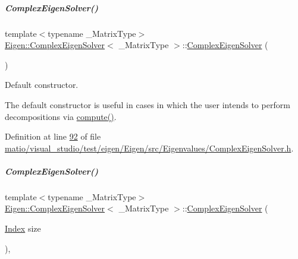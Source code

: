 \mbox{\label{group___eigenvalues___module_a3322a21574c61eefd450c003515ad802}} 
\subparagraph{\texorpdfstring{Complex\+Eigen\+Solver()}{ComplexEigenSolver()}\hspace{0.1cm}{\footnotesize\ttfamily [4/6]}}
{\footnotesize\ttfamily template$<$typename \+\_\+\+Matrix\+Type$>$ \\
\hyperlink{group___eigenvalues___module_class_eigen_1_1_complex_eigen_solver}{Eigen\+::\+Complex\+Eigen\+Solver}$<$ \+\_\+\+Matrix\+Type $>$\+::\hyperlink{group___eigenvalues___module_class_eigen_1_1_complex_eigen_solver}{Complex\+Eigen\+Solver} (\begin{DoxyParamCaption}{ }\end{DoxyParamCaption})\hspace{0.3cm}{\ttfamily [inline]}}



Default constructor. 

The default constructor is useful in cases in which the user intends to perform decompositions via \hyperlink{group___eigenvalues___module_aeb7e38c6db5369f5c974f3786e94c1f0}{compute()}. 

Definition at line \hyperlink{matio_2visual__studio_2test_2eigen_2_eigen_2src_2_eigenvalues_2_complex_eigen_solver_8h_source_l00092}{92} of file \hyperlink{matio_2visual__studio_2test_2eigen_2_eigen_2src_2_eigenvalues_2_complex_eigen_solver_8h_source}{matio/visual\+\_\+studio/test/eigen/\+Eigen/src/\+Eigenvalues/\+Complex\+Eigen\+Solver.\+h}.

\mbox{\label{group___eigenvalues___module_a86751f64ebcd5c554551fb5eaaa02db7}} 
\subparagraph{\texorpdfstring{Complex\+Eigen\+Solver()}{ComplexEigenSolver()}\hspace{0.1cm}{\footnotesize\ttfamily [5/6]}}
{\footnotesize\ttfamily template$<$typename \+\_\+\+Matrix\+Type$>$ \\
\hyperlink{group___eigenvalues___module_class_eigen_1_1_complex_eigen_solver}{Eigen\+::\+Complex\+Eigen\+Solver}$<$ \+\_\+\+Matrix\+Type $>$\+::\hyperlink{group___eigenvalues___module_class_eigen_1_1_complex_eigen_solver}{Complex\+Eigen\+Solver} (\begin{DoxyParamCaption}\item[{\hyperlink{group___eigenvalues___module_abc0218d8b902af0d6c759bfc0a8a8d74}{Index}}]{size }\end{DoxyParamCaption})\hspace{0.3cm}{\ttfamily [inline]}, {\ttfamily [explicit]}}



